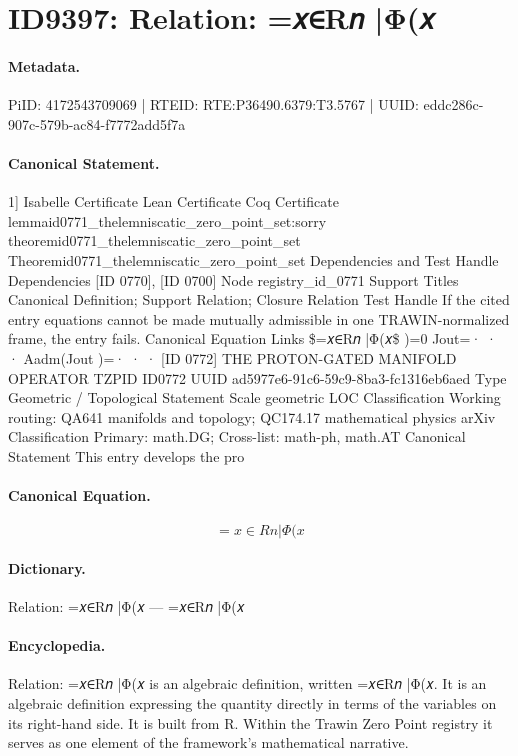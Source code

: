\section*{ID9397: Relation: =𝑥∈R𝑛 |Φ(𝑥}
\paragraph{Metadata.}
PiID: 4172543709069 | RTEID: RTE:P36490.6379:T3.5767 | UUID: eddc286c-907c-579b-ac84-f7772add5f7a

\paragraph{Canonical Statement.}
1] Isabelle Certificate Lean Certificate Coq Certificate lemmaid0771\_thelemniscatic\_zero\_point\_set:sorry theoremid0771\_thelemniscatic\_zero\_point\_set Theoremid0771\_thelemniscatic\_zero\_point\_set Dependencies and Test Handle Dependencies [ID 0770], [ID 0700] Node registry\_id\_0771 Support Titles Canonical Definition; Support Relation; Closure Relation Test Handle If the cited entry equations cannot be made mutually admissible in one TRAWIN-normalized frame, the entry fails. Canonical Equation Links \$=𝑥∈R𝑛 |Φ(𝑥\$ )=0 Jout=· · · Aadm(Jout )=· · · [ID 0772] THE PROTON-GATED MANIFOLD OPERATOR TZPID ID0772 UUID ad5977e6-91c6-59c9-8ba3-fc1316eb6aed Type Geometric / Topological Statement Scale geometric LOC Classification Working routing: QA641 manifolds and topology; QC174.17 mathematical physics arXiv Classification Primary: math.DG; Cross-list: math-ph, math.AT Canonical Statement This entry develops the pro

\paragraph{Canonical Equation.}
\[
=𝑥∈R𝑛 |Φ(𝑥
\]

\paragraph{Dictionary.}
Relation: =𝑥∈R𝑛 |Φ(𝑥 — =𝑥∈R𝑛 |Φ(𝑥

\paragraph{Encyclopedia.}
Relation: =𝑥∈R𝑛 |Φ(𝑥 is an algebraic definition, written =𝑥∈R𝑛 |Φ(𝑥. It is an algebraic definition expressing the quantity directly in terms of the variables on its right-hand side. It is built from R. Within the Trawin Zero Point registry it serves as one element of the framework's mathematical narrative.
